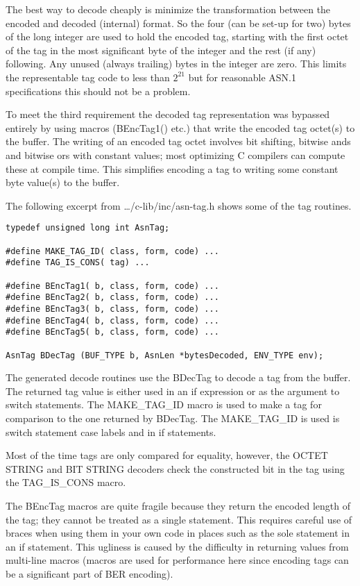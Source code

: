 The best way to decode cheaply is minimize the transformation between
the encoded and decoded (internal) format.  So the four (can be set-up
for two) bytes of the long integer are used to hold the encoded tag,
starting with the first octet of the tag in the most significant byte
of the integer and the rest (if any) following.  Any unused (always
trailing) bytes in the integer are zero.  This limits the
representable tag code to less than $2^{21}$ but for reasonable ASN.1
specifications this should not be a problem.

To meet the third requirement the decoded tag representation was
bypassed entirely by using macros ({\C BEncTag1()} etc.) that
write the encoded tag octet(s) to the buffer. The writing of an
encoded tag octet involves bit shifting, bitwise ands and bitwise ors
with constant values; most optimizing C compilers can compute these at
compile time.  This simplifies encoding a tag to writing some constant
byte value(s) to the buffer.

The following excerpt from {\ufn \dots/c-lib/inc/asn-tag.h} shows some
of the tag routines.
\begin{small}
\begin{verbatim}
typedef unsigned long int AsnTag;

#define MAKE_TAG_ID( class, form, code) ...
#define TAG_IS_CONS( tag) ...

#define BEncTag1( b, class, form, code) ...
#define BEncTag2( b, class, form, code) ...
#define BEncTag3( b, class, form, code) ...
#define BEncTag4( b, class, form, code) ...
#define BEncTag5( b, class, form, code) ...

AsnTag BDecTag (BUF_TYPE b, AsnLen *bytesDecoded, ENV_TYPE env);
\end{verbatim}
\end{small}

The generated decode routines use the {\C BDecTag} to decode a tag
from the buffer.  The returned tag value is either used in an
{\C if} expression or as the argument to {\C switch} statements.
The {\C MAKE\_TAG\_ID} macro is used to make a tag for comparison to
the one returned by {\C BDecTag}. The {\C MAKE\_TAG\_ID} is used is
{\C switch} statement case labels and in {\C if} statements.

Most of the time tags are only compared for equality, however, the
OCTET STRING and BIT STRING decoders check the constructed bit in the
tag using the {\C TAG\_IS\_CONS} macro.

The {\C BEncTag} macros are quite fragile because they return the
encoded length of the tag; they cannot be treated as a single
statement.  This requires careful use of braces when using them in
your own code in places such as the sole statement in an {\C if}
statement.  This ugliness is caused by the difficulty in returning
values from multi-line macros (macros are used for performance here
since encoding tags can be a significant part of BER encoding).

